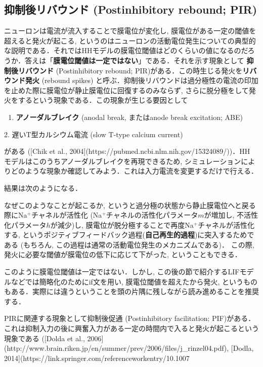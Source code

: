 \subsection{抑制後リバウンド (Postinhibitory rebound; PIR)}
ニューロンは電流が流入することで膜電位が変化し, 膜電位がある一定の閾値を超えると発火が起こる, というのはニューロンの活動電位発生についての典型的な説明である．それではHHモデルの膜電位閾値はどのくらいの値になるのだろうか．答えは「\textbf{膜電位閾値は一定ではない}」である．それを示す現象として \textbf{抑制後リバウンド} (Postinhibitory rebound; PIR)がある．この時生じる発火を\textbf{リバウンド発火} (rebound spikes) 
と呼ぶ．抑制後リバウンドは過分極性の電流の印加を止めた際に膜電位が静止膜電位に回復するのみならず, さらに脱分極をして発火をするという現象である．この現象が生じる要因として

\begin{enumerate}
\item \textbf{アノーダルブレイク} (anodal break, またはanode break excitation; ABE)
\end{enumerate}
2. 遅いT型カルシウム電流 (slow T-type calcium current)

がある ([Chik et al., 2004](https://pubmed.ncbi.nlm.nih.gov/15324089/))．HH モデルはこのうちアノーダルブレイクを再現できるため, シミュレーションによりどのような現象か確認してみよう．これは入力電流を変更するだけで行える．

結果は次のようになる．


なぜこのようなことが起こるか, というと過分極の状態から静止膜電位へと戻る際にNa$^+$チャネルが活性化 (Na$^+$チャネルの活性化パラメータ$m$が増加し, 不活性化パラメータ$h$が減少)し, 膜電位が脱分極することで再度Na$^+$チャネルが活性化する, というポジティブフィードバック過程(\textbf{自己再生的過程})に突入するためである (もちろん, この過程は通常の活動電位発生のメカニズムである)． この際, 発火に必要な閾値が膜電位の低下に応じて下がった, ということもできる．

このように膜電位閾値は一定ではない．しかし, この後の節で紹介するLIFモデルなどでは簡略化のためにif文を用い, 膜電位閾値を超えたから発火, というものもある．実際には違うということを頭の片隅に残しながら読み進めることを推奨する．

PIRに関連する現象として抑制後促通 (Postinhibitory facilitation; PIF)がある．これは抑制入力の後に興奮入力がある一定の時間内で入ると発火が起こるという現象である ([Dolda et al., 2006](http://www.brain.riken.jp/en/summer/prev/2006/files/j_rinzel04.pdf), [Dodla, 2014](https://link.springer.com/referenceworkentry/10.1007%
